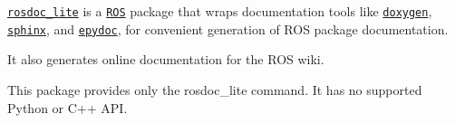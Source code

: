 \href{http://wiki.ros.org/rosdoc_lite}{\tt rosdoc\-\_\-lite} is a \href{http://www.ros.org}{\tt R\-O\-S} package that wraps documentation tools like \href{http://www.doxygen.org}{\tt doxygen}, \href{http://sphinx-doc.org}{\tt sphinx}, and \href{http://epydoc.sourceforge.net/}{\tt epydoc}, for convenient generation of R\-O\-S package documentation.

It also generates online documentation for the R\-O\-S wiki.

This package provides only the {\ttfamily rosdoc\-\_\-lite} command. It has no supported Python or C++ A\-P\-I. 